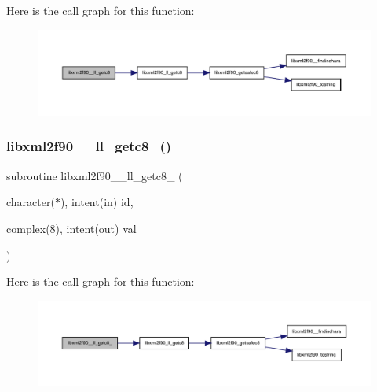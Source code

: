 Here is the call graph for this function\+:
\nopagebreak
\begin{figure}[H]
\begin{center}
\leavevmode
\includegraphics[width=350pt]{libxml2f90_8f90__pp_8f90_a5d4a74ac67abc4657d96bcc55fad78f3_cgraph}
\end{center}
\end{figure}
\mbox{\label{libxml2f90_8f90__pp_8f90_a3cf0a08fd399cfb2380738008cc1523e}} 
\subsubsection{\texorpdfstring{libxml2f90\+\_\+\+\_\+ll\+\_\+getc8\+\_\+()}{libxml2f90\_\_ll\_getc8\_()}}
{\footnotesize\ttfamily subroutine libxml2f90\+\_\+\+\_\+ll\+\_\+getc8\+\_\+ (\begin{DoxyParamCaption}\item[{character($\ast$), intent(in)}]{id,  }\item[{complex(8), intent(out)}]{val }\end{DoxyParamCaption})}

Here is the call graph for this function\+:
\nopagebreak
\begin{figure}[H]
\begin{center}
\leavevmode
\includegraphics[width=350pt]{libxml2f90_8f90__pp_8f90_a3cf0a08fd399cfb2380738008cc1523e_cgraph}
\end{center}
\end{figure}
\mbox{\label{libxml2f90_8f90__pp_8f90_a6197ea91babb017cbc3cec50fe124c03}} 
